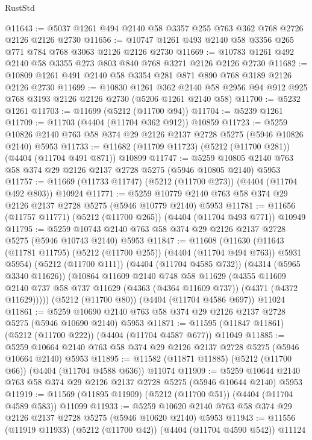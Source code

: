 \begin{lexlean}{RustStd}
\begin{coremodule}
@11643 := @5037 @1261 @494 @2140 @58 @3357 @255 @763 @362 @768 @2726 @2126 @2126 @2730
@11656 := @10747 @1261 @493 @2140 @58 @3356 @265 @771 @784 @768 @3063 @2126 @2126 @2730
@11669 := @10783 @1261 @492 @2140 @58 @3355 @273 @803 @840 @768 @3271 @2126 @2126 @2730
@11682 := @10809 @1261 @491 @2140 @58 @3354 @281 @871 @890 @768 @3189 @2126 @2126 @2730
@11699 := @10830
    @1261
    @362
    @2140
    @58
    @2956
    @94
    @912
    @925
    @768
    @3193
    @2126
    @2126
    @2730
    (@5206 @1261 @2140 @58)
@11700 := @5232 @1261
@11703 := @11699 (@5212 (@11700 @94))
@11704 := @5239 @1261
@11709 := @11703 (@4404 (@11704 @362 @912)) @10859
@11723 := @5259 @10826 @2140 @763 @58 @374 @29 @2126 @2137 @2728 @5275 (@5946 @10826 @2140) @5953
@11733 := @11682 (@11709 @11723) (@5212 (@11700 @281)) (@4404 (@11704 @491 @871)) @10899
@11747 := @5259 @10805 @2140 @763 @58 @374 @29 @2126 @2137 @2728 @5275 (@5946 @10805 @2140) @5953
@11757 := @11669 (@11733 @11747) (@5212 (@11700 @273)) (@4404 (@11704 @492 @803)) @10924
@11771 := @5259 @10779 @2140 @763 @58 @374 @29 @2126 @2137 @2728 @5275 (@5946 @10779 @2140) @5953
@11781 := @11656 (@11757 @11771) (@5212 (@11700 @265)) (@4404 (@11704 @493 @771)) @10949
@11795 := @5259 @10743 @2140 @763 @58 @374 @29 @2126 @2137 @2728 @5275 (@5946 @10743 @2140) @5953
@11847 := @11608
    (@11630
      (@11643 (@11781 @11795) (@5212 (@11700 @255)) (@4404 (@11704 @494 @763)) @5931 @5954)
      (@5212 (@11700 @111))
      (@4404 (@11704 @4585 @732))
      (@4314 (@5965 @3340 @11626))
      (@10864
        @11609
        @2140
        @748
        @58
        @11629
        (@4355
          @11609
          @2140
          @737
          @58
          @737
          @11629
          (@4363 (@4364 @11609 @737))
          (@4371 (@4372 @11629)))))
    (@5212 (@11700 @80))
    (@4404 (@11704 @4586 @697))
    @11024
@11861 := @5259 @10690 @2140 @763 @58 @374 @29 @2126 @2137 @2728 @5275 (@5946 @10690 @2140) @5953
@11871 := @11595 (@11847 @11861) (@5212 (@11700 @222)) (@4404 (@11704 @4587 @677)) @11049
@11885 := @5259 @10664 @2140 @763 @58 @374 @29 @2126 @2137 @2728 @5275 (@5946 @10664 @2140) @5953
@11895 := @11582 (@11871 @11885) (@5212 (@11700 @66)) (@4404 (@11704 @4588 @636)) @11074
@11909 := @5259 @10644 @2140 @763 @58 @374 @29 @2126 @2137 @2728 @5275 (@5946 @10644 @2140) @5953
@11919 := @11569 (@11895 @11909) (@5212 (@11700 @51)) (@4404 (@11704 @4589 @583)) @11099
@11933 := @5259 @10620 @2140 @763 @58 @374 @29 @2126 @2137 @2728 @5275 (@5946 @10620 @2140) @5953
@11943 := @11556 (@11919 @11933) (@5212 (@11700 @42)) (@4404 (@11704 @4590 @542)) @11124

\end{coremodule}
\end{lexlean}
